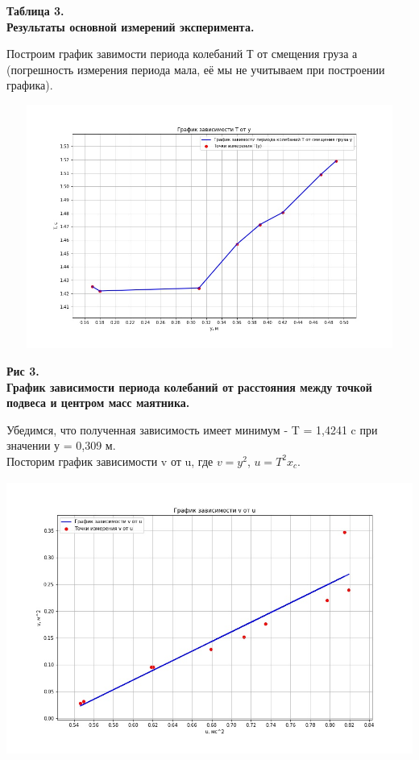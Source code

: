 \begin{flushright}
{\scriptsize \textbf{Таблица 3.}\\ \textbf {Результаты основной измерений эксперимента.}}
\end{flushright}

    Построим график завимости периода колебаний Т от смещения груза а (погрешность измерения периода мала, её мы не учитываем при построении графика). 
    
    
\begin{center}
\includegraphics[width=15cm, height=8cm]{graph_1.jpg}
\end{center}

\begin{flushright}
{\scriptsize \textbf{Рис 3.}\\ \textbf {График зависимости периода колебаний от расстояния между точкой подвеса и центром масс маятника.}}
\end{flushright}

    Убедимся, что полученная зависимость имеет минимум - T = 1,4241 c при значении у = 0,309 м.\\


    
    Посторим график зависимости v от u, где $v = y^2$, $u = T^2x_c$.



\begin{center}
\includegraphics[width=15cm, height=9cm]{graph_2.jpg}
\end{center}

